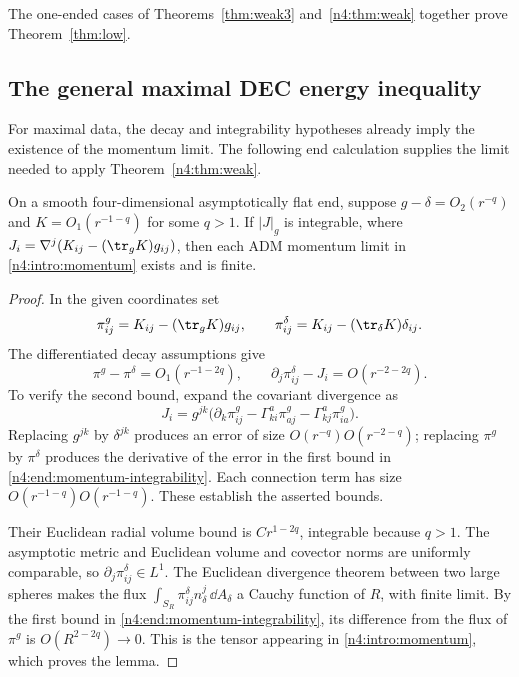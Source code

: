 The one-ended cases of Theorems~\ref{thm:weak3} and~\ref{n4:thm:weak}
together prove Theorem~\ref{thm:low}.

\subsection{The general maximal DEC energy inequality}

For maximal data, the decay and integrability hypotheses already imply
the existence of the momentum limit. The following end calculation
supplies the limit needed to apply Theorem~\ref{n4:thm:weak}.

\begin{lemma}\label{n4:lem:momentum-exists}
On a smooth four-dimensional asymptotically flat end, suppose
$g-\delta=O_2(r^{-q})$ and $K=O_1(r^{-1-q})$ for some $q>1$.
If $|J|_g$ is integrable, where
$J_i=\nabla^j(K_{ij}-(\tr_gK)g_{ij})$, then each ADM momentum
limit in \eqref{n4:intro:momentum} exists and is finite.
\end{lemma}

\begin{proof}
In the given coordinates set
\[
 \pi^g_{ij}=K_{ij}-(\tr_gK)g_{ij},\qquad
 \pi^\delta_{ij}=K_{ij}-(\tr_\delta K)\delta_{ij}.
\]
The differentiated decay assumptions give
\begin{equation}\label{n4:end:momentum-integrability}
 \pi^g-\pi^\delta=O_1(r^{-1-2q}),\qquad
 \partial_j\pi^\delta_{ij}-J_i=O(r^{-2-2q}).
\end{equation}
To verify the second bound, expand the covariant divergence as
\[
 J_i=g^{jk}\bigl(\partial_k\pi^g_{ij}
       -\Gamma^a_{ki}\pi^g_{aj}-\Gamma^a_{kj}\pi^g_{ia}\bigr).
\]
Replacing $g^{jk}$ by $\delta^{jk}$ produces an error of size
$O(r^{-q})O(r^{-2-q})$; replacing $\pi^g$ by $\pi^\delta$
produces the derivative of the error in the first bound in
\eqref{n4:end:momentum-integrability}. Each connection term has size
$O(r^{-1-q})O(r^{-1-q})$. These establish the asserted bounds.

Their Euclidean radial volume bound is $Cr^{1-2q}$, integrable because
$q>1$. The asymptotic metric and Euclidean volume and covector norms
are uniformly comparable, so $\partial_j\pi^\delta_{ij}\in L^1$.
The Euclidean divergence theorem between two large spheres makes
the flux $\int_{S_R}\pi^\delta_{ij}n_\delta^j\,\dd A_\delta$
a Cauchy function of $R$, with finite limit. By the first bound in
\eqref{n4:end:momentum-integrability}, its difference from the flux
of $\pi^g$ is $O(R^{2-2q})\to0$. This is the tensor appearing
in \eqref{n4:intro:momentum}, which proves the lemma.
\end{proof}

